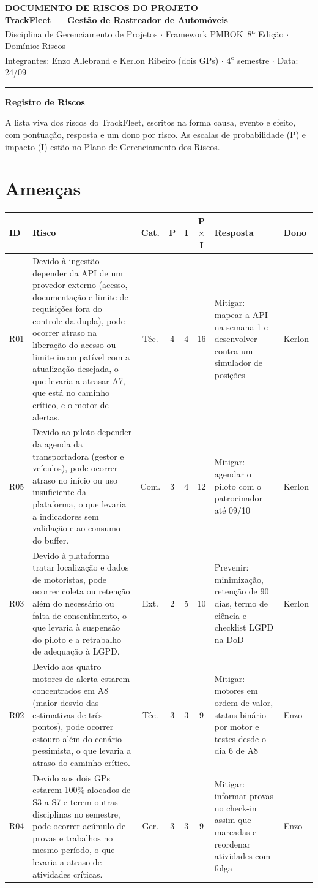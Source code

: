 \documentclass[11pt,a4paper]{article}
\newcommand{\cabecalho}[3]{%
  \begin{center}
  {\Large\bfseries DOCUMENTO DE #1 DO PROJETO}\\[2pt]
  {\large\bfseries TrackFleet --- Gestão de Rastreador de Automóveis}\\[4pt]
  Disciplina de Gerenciamento de Projetos $\cdot$ Framework PMBOK\textregistered\ 8\textsuperscript{a} Edição $\cdot$ Domínio: #2\\[2pt]
  Integrantes: Enzo Allebrand e Kerlon Ribeiro (dois GPs) $\cdot$ 4\textsuperscript{o} semestre $\cdot$ Data: #3
  \end{center}
  \vspace{2mm}\hrule\vspace{4mm}}
\newcommand{\parte}[1]{\noindent\textbf{\large #1}\par\vspace{1mm}}
\begin{document}
\cabecalho{RISCOS}{Riscos}{24/09}

\parte{Registro de Riscos}
\noindent A lista viva dos riscos do TrackFleet, escritos na forma causa, evento e efeito, com pontuação, resposta e um dono por risco. As escalas de probabilidade (P) e impacto (I) estão no Plano de Gerenciamento dos Riscos.

\section{Ameaças}

{\small
\begin{xltabular}{\textwidth}{l L c c c c >{\raggedright\arraybackslash}p{3.4cm} l}
\toprule
\textbf{ID} & \textbf{Risco} & \textbf{Cat.} & \textbf{P} & \textbf{I} & \textbf{P$\times$I} & \textbf{Resposta} & \textbf{Dono} \\
\midrule
\endhead
R01 & Devido à ingestão depender da API de um provedor externo (acesso, documentação e limite de requisições fora do controle da dupla), pode ocorrer atraso na liberação do acesso ou limite incompatível com a atualização desejada, o que levaria a atrasar A7, que está no caminho crítico, e o motor de alertas. & Téc. & 4 & 4 & 16 & Mitigar: mapear a API na semana 1 e desenvolver contra um simulador de posições & Kerlon \\
\addlinespace
R05 & Devido ao piloto depender da agenda da transportadora (gestor e veículos), pode ocorrer atraso no início ou uso insuficiente da plataforma, o que levaria a indicadores sem validação e ao consumo do buffer. & Com. & 3 & 4 & 12 & Mitigar: agendar o piloto com o patrocinador até 09/10 & Kerlon \\
\addlinespace
R03 & Devido à plataforma tratar localização e dados de motoristas, pode ocorrer coleta ou retenção além do necessário ou falta de consentimento, o que levaria à suspensão do piloto e a retrabalho de adequação à LGPD. & Ext. & 2 & 5 & 10 & Prevenir: minimização, retenção de 90 dias, termo de ciência e checklist LGPD na DoD & Kerlon \\
\addlinespace
R02 & Devido aos quatro motores de alerta estarem concentrados em A8 (maior desvio das estimativas de três pontos), pode ocorrer estouro além do cenário pessimista, o que levaria a atraso do caminho crítico. & Téc. & 3 & 3 & 9 & Mitigar: motores em ordem de valor, status binário por motor e testes desde o dia 6 de A8 & Enzo \\
\addlinespace
R04 & Devido aos dois GPs estarem 100\% alocados de S3 a S7 e terem outras disciplinas no semestre, pode ocorrer acúmulo de provas e trabalhos no mesmo período, o que levaria a atraso de atividades críticas. & Ger. & 3 & 3 & 9 & Mitigar: informar provas no check-in assim que marcadas e reordenar atividades com folga & Enzo \\

\end{xltabular}}
\end{document}
